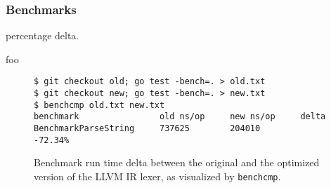 
\subsubsection{Benchmarks}

percentage delta.

foo

\begin{figure}[htbp]
	\begin{center}
		\begin{verbatim}
$ git checkout old; go test -bench=. > old.txt
$ git checkout new; go test -bench=. > new.txt
$ benchcmp old.txt new.txt
benchmark                old ns/op     new ns/op     delta
BenchmarkParseString     737625        204010        -72.34%
		\end{verbatim}
		\caption{Benchmark run time delta between the original and the optimized version of the LLVM IR lexer, as visualized by \texttt{benchcmp}\protect\footnotemark.}
		\label{fig:benchmark_delta}
	\end{center}
\end{figure}
